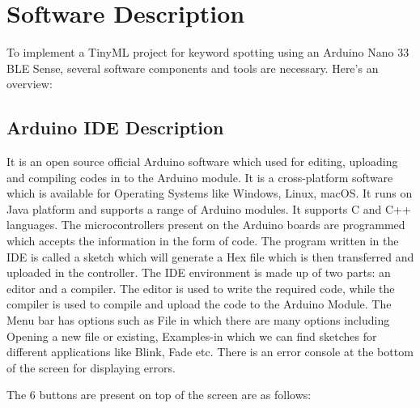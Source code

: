 %
%

\chapter{Software Description}

To implement a TinyML project for keyword spotting using an Arduino Nano 33 BLE Sense, several software components and tools are necessary. Here's an overview:

\section{Arduino IDE Description}\label{ArduinoIDE}

It is an open source official Arduino software which used for editing, uploading and
compiling codes in to the Arduino module. It is a cross-platform software which is
available for Operating Systems like Windows, Linux, macOS. It runs on Java platform
and supports a range of Arduino modules. It supports C and C++ languages. The
microcontrollers present on the Arduino boards are programmed which accepts the
information in the form of code. The program written in the IDE is called a sketch
which will generate a Hex file which is then transferred and uploaded in the controller.
The IDE environment is made up of two parts: an editor and a compiler. The editor
is used to write the required code, while the compiler is used to compile and upload
the code to the Arduino Module.\cite{Fezari:2018}
The Menu bar has options such as File in which there are many options including
Opening a new file or existing, Examples-in which we can find sketches for different
applications like Blink, Fade etc. There is an error console at the bottom of the screen
for displaying errors.

The 6 buttons are present on top of the screen are as follows:

